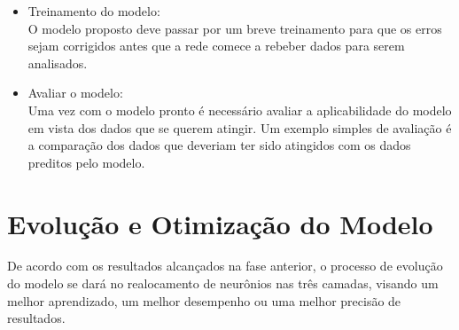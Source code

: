 \begin{itemize}
        \item Treinamento do modelo: \\ O modelo proposto deve passar por um breve treinamento para que os erros sejam corrigidos antes que a rede comece a rebeber dados para serem analisados.

        \item Avaliar o modelo: \\ Uma vez com o modelo pronto é necessário avaliar a aplicabilidade do modelo em vista dos dados que se querem atingir. Um exemplo simples de avaliação é a comparação dos dados que deveriam ter sido atingidos com os dados preditos pelo modelo.

    \end{itemize}

\section{Evolução e Otimização do Modelo}
    De acordo com os resultados alcançados na fase anterior, o processo de evolução do modelo se dará no realocamento de neurônios nas três camadas, visando um melhor aprendizado, um melhor desempenho ou uma melhor precisão de resultados.







